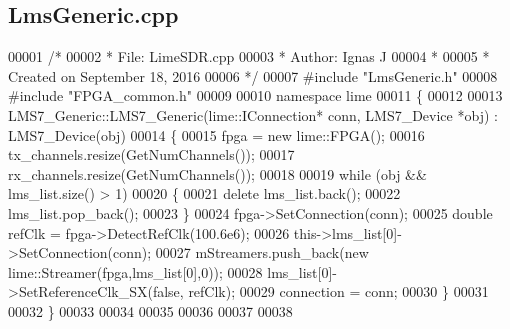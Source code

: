 \subsection{Lms\+Generic.\+cpp}
\label{LmsGeneric_8cpp_source}

\begin{DoxyCode}
00001 \textcolor{comment}{/*}
00002 \textcolor{comment}{ * File:   LimeSDR.cpp}
00003 \textcolor{comment}{ * Author: Ignas J}
00004 \textcolor{comment}{ *}
00005 \textcolor{comment}{ * Created on September 18, 2016}
00006 \textcolor{comment}{ */}
00007 \textcolor{preprocessor}{#include "LmsGeneric.h"}
00008 \textcolor{preprocessor}{#include "FPGA_common.h"}
00009 
00010 \textcolor{keyword}{namespace }lime
00011 \{
00012 
00013 LMS7_Generic::LMS7_Generic(lime::IConnection* conn, LMS7_Device *obj) : 
      LMS7_Device(obj) 
00014 \{
00015     fpga = \textcolor{keyword}{new} lime::FPGA();
00016     tx_channels.resize(GetNumChannels());
00017     rx_channels.resize(GetNumChannels());
00018     
00019     \textcolor{keywordflow}{while} (obj && lms_list.size() > 1)
00020     \{
00021         \textcolor{keyword}{delete} lms_list.back();
00022         lms_list.pop\_back();
00023     \}
00024     fpga->SetConnection(conn);
00025     \textcolor{keywordtype}{double} refClk = fpga->DetectRefClk(100.6e6);
00026     this->lms_list[0]->SetConnection(conn);
00027     mStreamers.push\_back(\textcolor{keyword}{new} lime::Streamer(fpga,lms_list[0],0));
00028     lms_list[0]->SetReferenceClk\_SX(\textcolor{keyword}{false}, refClk);
00029     connection = conn;
00030 \}
00031 
00032 \}
00033 
00034 
00035 
00036 
00037 
00038 
\end{DoxyCode}
